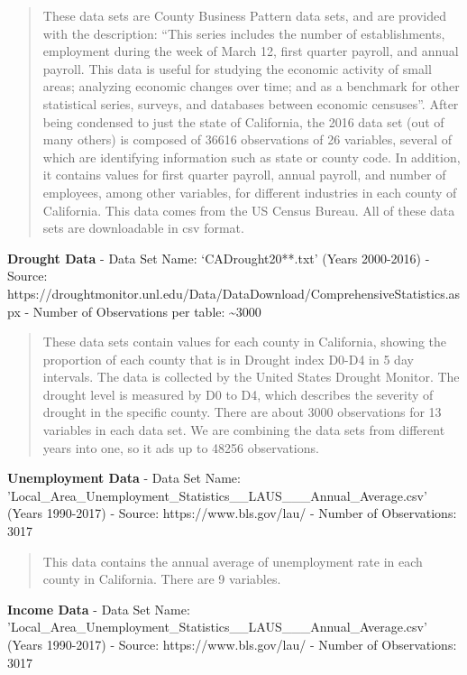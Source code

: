 \documentclass[11pt]{article}
\begin{document}
\begin{quote}
These data sets are County Business Pattern data sets, and are provided
with the description: ``This series includes the number of
establishments, employment during the week of March 12, first quarter
payroll, and annual payroll. This data is useful for studying the
economic activity of small areas; analyzing economic changes over time;
and as a benchmark for other statistical series, surveys, and databases
between economic censuses''. After being condensed to just the state of
California, the 2016 data set (out of many others) is composed of 36616
observations of 26 variables, several of which are identifying
information such as state or county code. In addition, it contains
values for first quarter payroll, annual payroll, and number of
employees, among other variables, for different industries in each
county of California. This data comes from the US Census Bureau. All of
these data sets are downloadable in csv format.
\end{quote}

\textbf{Drought Data} - Data Set Name: `CADrought20**.txt' (Years
2000-2016) - Source:
https://droughtmonitor.unl.edu/Data/DataDownload/ComprehensiveStatistics.aspx
- Number of Observations per table: \textasciitilde{}3000

\begin{quote}
These data sets contain values for each county in California, showing
the proportion of each county that is in Drought index D0-D4 in 5 day
intervals. The data is collected by the United States Drought Monitor.
The drought level is measured by D0 to D4, which describes the severity
of drought in the specific county. There are about 3000 observations for
13 variables in each data set. We are combining the data sets from
different years into one, so it ads up to 48256 observations.
\end{quote}

\textbf{Unemployment Data} - Data Set Name:
'Local\_Area\_Unemployment\_Statistics\_\_LAUS\_\_\_Annual\_Average.csv'
(Years 1990-2017) - Source: https://www.bls.gov/lau/ - Number of
Observations: 3017

\begin{quote}
This data contains the annual average of unemployment rate in each
county in California. There are 9 variables.
\end{quote}

\textbf{Income Data} - Data Set Name:
'Local\_Area\_Unemployment\_Statistics\_\_LAUS\_\_\_Annual\_Average.csv'
(Years 1990-2017) - Source: https://www.bls.gov/lau/ - Number of
Observations: 3017
\end{document}
